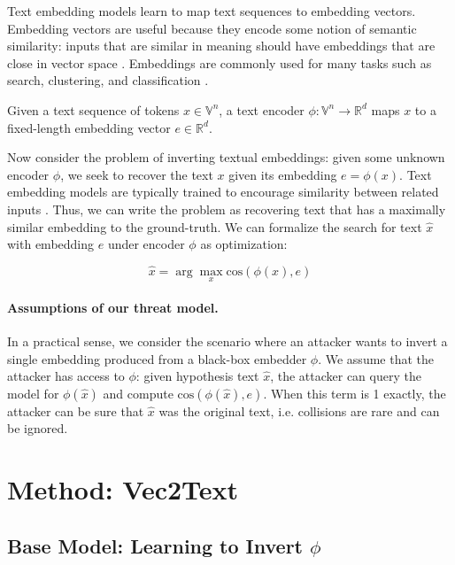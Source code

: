 \documentclass[11pt]{article}
\begin{document}
Text embedding models learn to map text sequences to embedding vectors. Embedding vectors are useful because they encode some notion of semantic similarity: inputs that are similar in meaning should have embeddings that are close in vector space \cite{mikolov2013efficient}. Embeddings are commonly used for many tasks such as search, clustering, and classification \cite{aggarwal2012, neelakantan2022textopenai, muennighoff2023mteb}.

Given a text sequence of tokens $x \in \mathbb{V}^{n}$, a text encoder $\phi : \mathbb{V}^{n} \rightarrow \mathbb{R}^d$ maps $x$ to a fixed-length embedding vector $e \in \mathbb{R}^d$.

Now consider the problem of inverting textual embeddings: given some unknown encoder $\phi$, we seek to recover the text $x$ given its embedding $e = \phi(x)$. Text embedding models are typically trained to encourage similarity between related inputs \cite{karpukhin2020dpr}. Thus, we can write the problem as recovering text that has a maximally similar embedding to the ground-truth. We can formalize the search for text $\hat{x}$ with embedding $e$ under encoder $\phi$ as optimization:

\begin{equation}
\label{eq:prob}
\hat{x} = \arg\max_{x} \text{cos}(\phi(x), e)
\end{equation}

\paragraph{Assumptions of our threat model.} In a practical sense, we consider the scenario where an attacker wants to invert a single embedding produced from a black-box embedder $\phi$. We assume that the attacker has access to $\phi$: given hypothesis text $\hat{x}$, the attacker can query the model for $\phi(\hat{x})$ and compute $\text{cos}( \phi(\hat{x}), e)$. When this term is 1 exactly, the attacker can be sure that $\hat{x}$ was the original text, i.e. collisions are rare and can be ignored.

\section{Method: Vec2Text}
\label{sec:method}

\subsection{Base Model: Learning to Invert $\phi$}
\label{sec:simple}
\end{document}
